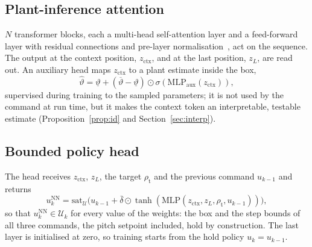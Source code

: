 \subsection{Plant-inference attention}
$N$ transformer blocks, each a multi-head self-attention layer and a feed-forward layer with residual connections and pre-layer normalisation~\cite{Vaswani2017}, act on the sequence. The output at the context position, $z_{\mathrm{ctx}}$, and at the last position, $z_L$, are read out. An auxiliary head maps $z_{\mathrm{ctx}}$ to a plant estimate inside the box,
\begin{equation}\label{eq:aux}
\hat\vartheta=\underline\vartheta+(\overline\vartheta-\underline\vartheta)\odot\sigma(\mathrm{MLP}_{\mathrm{aux}}(z_{\mathrm{ctx}})),
\end{equation}
supervised during training to the sampled parameters; it is not used by the command at run time, but it makes the context token an interpretable, testable estimate (Proposition~\ref{prop:id} and Section~\ref{sec:interp}).

\subsection{Bounded policy head}
The head receives $z_{\mathrm{ctx}}$, $z_L$, the target $\rho_{\mathrm t}$ and the previous command $u_{k-1}$ and returns
\begin{equation}\label{eq:bph}
u^{\mathrm{NN}}_k=\mathrm{sat}_{\mathcal U}\big(u_{k-1}+\bar\delta\odot\tanh(\mathrm{MLP}(z_{\mathrm{ctx}},z_L,\rho_{\mathrm t},u_{k-1}))\big),
\end{equation}
so that $u^{\mathrm{NN}}_k\in\mathcal U_k$ for every value of the weights: the box and the step bounds of all three commands, the pitch setpoint included, hold by construction. The last layer is initialised at zero, so training starts from the hold policy $u_k=u_{k-1}$.

